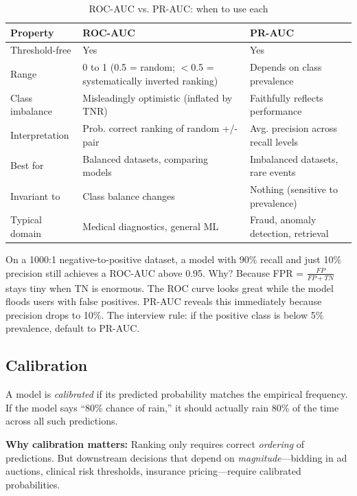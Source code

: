 \begin{table}[H]
\centering
\caption{ROC-AUC vs. PR-AUC: when to use each}
\begin{tabularx}{\textwidth}{lXX}
\toprule
\textbf{Property} & \textbf{ROC-AUC} & \textbf{PR-AUC} \\
\midrule
Threshold-free & Yes & Yes \\
Range & 0 to 1 (0.5 = random; $<$0.5 = systematically inverted ranking) & Depends on class prevalence \\
Class imbalance & Misleadingly optimistic (inflated by TNR) & Faithfully reflects performance \\
Interpretation & Prob. correct ranking of random +/- pair & Avg. precision across recall levels \\
Best for & Balanced datasets, comparing models & Imbalanced datasets, rare events \\
Invariant to & Class balance changes & Nothing (sensitive to prevalence) \\
Typical domain & Medical diagnostics, general ML & Fraud, anomaly detection, retrieval \\
\bottomrule
\end{tabularx}
\end{table}

\begin{keyinsight}
On a 1000:1 negative-to-positive dataset, a model with 90\% recall and just 10\% precision still achieves a ROC-AUC above 0.95. Why? Because FPR = $\frac{FP}{FP+TN}$ stays tiny when TN is enormous. The ROC curve looks great while the model floods users with false positives. PR-AUC reveals this immediately because precision drops to 10\%. The interview rule: if the positive class is below 5\% prevalence, default to PR-AUC.
\end{keyinsight}

\subsection{Calibration}

A model is \textit{calibrated} if its predicted probability matches the empirical frequency. If the model says ``80\% chance of rain,'' it should actually rain 80\% of the time across all such predictions.

\textbf{Why calibration matters:} Ranking only requires correct \textit{ordering} of predictions. But downstream decisions that depend on \textit{magnitude}---bidding in ad auctions, clinical risk thresholds, insurance pricing---require calibrated probabilities.

